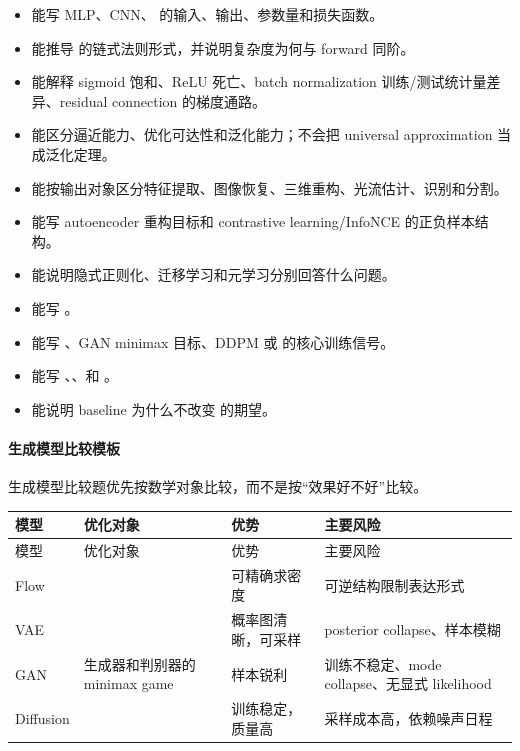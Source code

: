 \begin{itemize}
  \item 能写 MLP、CNN、 的输入、输出、参数量和损失函数。
  \item 能推导  的链式法则形式，并说明复杂度为何与 forward 同阶。
  \item 能解释 sigmoid 饱和、ReLU 死亡、batch normalization 训练/测试统计量差异、residual connection 的梯度通路。
  \item 能区分逼近能力、优化可达性和泛化能力；不会把 universal approximation 当成泛化定理。
  \item 能按输出对象区分特征提取、图像恢复、三维重构、光流估计、识别和分割。
  \item 能写 autoencoder 重构目标和 contrastive learning/InfoNCE 的正负样本结构。
  \item 能说明隐式正则化、迁移学习和元学习分别回答什么问题。
  \item 能写 。
  \item 能写 、GAN minimax 目标、DDPM 或  的核心训练信号。
  \item 能写 、、和 。
  \item 能说明 baseline 为什么不改变  的期望。
\end{itemize}

\paragraph{生成模型比较模板}

生成模型比较题优先按数学对象比较，而不是按“效果好不好”比较。

\begingroup
\small
\setlength{\tabcolsep}{3pt}
\begin{longtable}{L{0.14\textwidth}L{0.25\textwidth}L{0.18\textwidth}L{0.25\textwidth}}
\toprule
模型 & 优化对象 & 优势 & 主要风险 \\
\midrule
\endfirsthead
\toprule
模型 & 优化对象 & 优势 & 主要风险 \\
\midrule
\endhead
Flow &  & 可精确求密度 & 可逆结构限制表达形式 \\
VAE &  & 概率图清晰，可采样 & posterior collapse、样本模糊 \\
GAN & 生成器和判别器的 minimax game & 样本锐利 & 训练不稳定、mode collapse、无显式 likelihood \\
Diffusion &  & 训练稳定，质量高 & 采样成本高，依赖噪声日程 \\
\bottomrule
\end{longtable}
\endgroup

